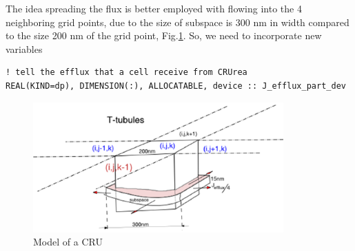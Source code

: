 The idea spreading the flux is better employed with flowing into the 4
neighboring grid points, due to the size of subspace is 300 nm in width compared
to the size 200 nm of the grid point, Fig.\ref{fig:CRU_spatial}. So, we need to
incorporate new variables 
\begin{verbatim}
! tell the efflux that a cell receive from CRUrea
REAL(KIND=dp), DIMENSION(:), ALLOCATABLE, device :: J_efflux_part_dev  
\end{verbatim}

\begin{figure}[hbt]
  \centerline{\includegraphics[height=5cm,
    angle=0]{./images/CRU_spatial.eps}}
  \caption{Model of a CRU}
  \label{fig:CRU_spatial}
\end{figure}
 
